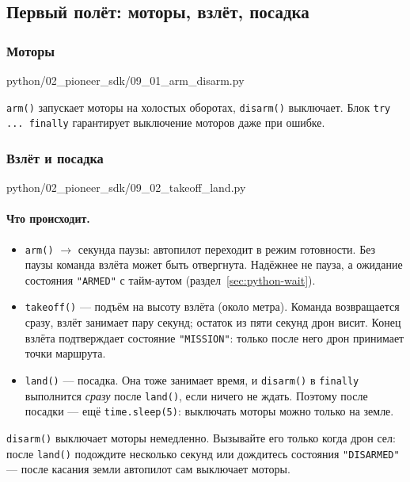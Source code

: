 \subsection{Первый полёт: моторы, взлёт, посадка}

\subsubsection*{Моторы}

\begin{codefile}[python]{python/02_pioneer_sdk/09_01_arm_disarm.py}
\end{codefile}

\verb|arm()| запускает моторы на холостых оборотах, \verb|disarm()| выключает. Блок \verb|try ... finally| гарантирует выключение моторов даже при ошибке.

\subsubsection*{Взлёт и посадка}

\begin{codefile}[python]{python/02_pioneer_sdk/09_02_takeoff_land.py}
\end{codefile}

\paragraph{Что происходит.}
\begin{itemize}
    \item \verb|arm()| $\to$ секунда паузы: автопилот переходит в режим готовности. Без паузы команда взлёта может быть отвергнута. Надёжнее не пауза, а ожидание состояния \verb|"ARMED"| с тайм-аутом (раздел~\ref{sec:python-wait}).
    \item \verb|takeoff()| --- подъём на высоту взлёта (около метра). Команда возвращается сразу, взлёт занимает пару секунд; остаток из пяти секунд дрон висит. Конец взлёта подтверждает состояние \verb|"MISSION"|: только после него дрон принимает точки маршрута.
    \item \verb|land()| --- посадка. Она тоже занимает время, и \verb|disarm()| в \verb|finally| выполнится \emph{сразу} после \verb|land()|, если ничего не ждать. Поэтому после посадки --- ещё \verb|time.sleep(5)|: выключать моторы можно только на земле.
\end{itemize}

\begin{warnbox}
\verb|disarm()| выключает моторы немедленно. Вызывайте его только когда дрон сел: после \verb|land()| подождите несколько секунд или дождитесь состояния \verb|"DISARMED"| --- после касания земли автопилот сам выключает моторы.
\end{warnbox}

